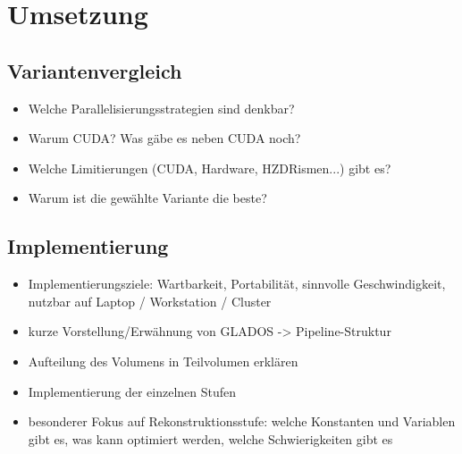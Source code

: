 \chapter{Umsetzung}

\section{Variantenvergleich}

\begin{itemize}
    \item Welche Parallelisierungsstrategien sind denkbar?
    \item Warum CUDA? Was gäbe es neben CUDA noch?
    \item Welche Limitierungen (CUDA, Hardware, HZDRismen...) gibt es?
    \item Warum ist die gewählte Variante die beste?
\end{itemize}

\section{Implementierung}

\begin{itemize}
    \item Implementierungsziele: Wartbarkeit, Portabilität, sinnvolle Geschwindigkeit, nutzbar auf Laptop / Workstation
          / Cluster
    \item kurze Vorstellung/Erwähnung von GLADOS -> Pipeline-Struktur
    \item Aufteilung des Volumens in Teilvolumen erklären
    \item Implementierung der einzelnen Stufen
    \item besonderer Fokus auf Rekonstruktionsstufe: welche Konstanten und Variablen gibt es, was kann optimiert werden,
          welche Schwierigkeiten gibt es
\end{itemize}
